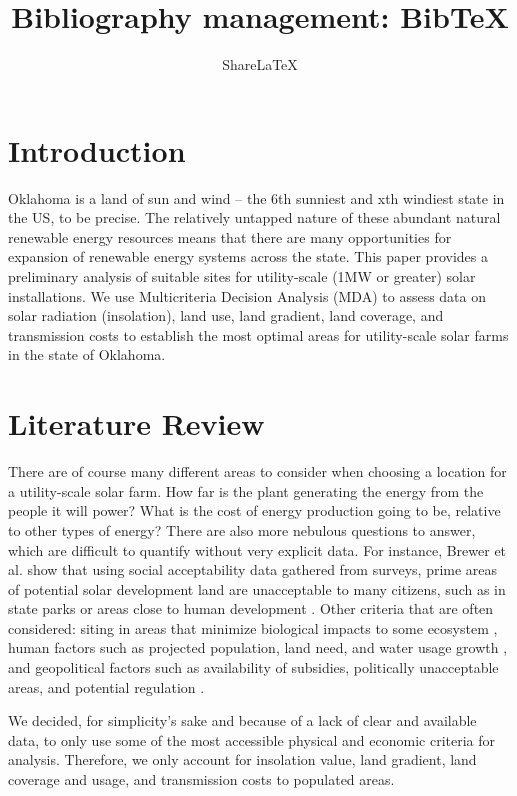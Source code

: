 \documentclass[a4paper,10pt]{article}
\title{Bibliography management: BibTeX}
\author{Share\LaTeX}
\begin{document}
\maketitle

\section{Introduction}

Oklahoma is a land of sun and wind – the 6th sunniest and xth windiest state in the US, to be precise. The relatively untapped nature of these abundant natural renewable energy resources means that there are many opportunities for expansion of renewable energy systems across the state. This paper provides a preliminary analysis of suitable sites for utility-scale (1MW or greater) solar installations. We use Multicriteria Decision Analysis (MDA) to assess data on solar radiation (insolation), land use, land gradient, land coverage, and transmission costs to establish the most optimal areas for utility-scale solar farms in the state of Oklahoma. 

\section{Literature Review}

There are of course many different areas to consider when choosing a location for a utility-scale solar farm. How far is the plant generating the energy from the people it will power? What is the cost of energy production going to be, relative to other types of energy? There are also more nebulous questions to answer, which are difficult to quantify without very explicit data. For instance, Brewer et al. show that using social acceptability data gathered from surveys, prime areas of potential solar development land are unacceptable to many citizens, such as in state parks or areas close to human development \cite{brewer}. Other criteria that are often considered: siting in areas that minimize biological impacts to some ecosystem \cite{stoms}, human factors such as projected population, land need, and water usage growth \cite{omitaomu}, and geopolitical factors such as availability of subsidies, politically unacceptable areas, and potential regulation \cite{tisza}. 

We decided, for simplicity's sake and because of a lack of clear and available data, to only use some of the most accessible physical and economic criteria for analysis. Therefore, we only account for insolation value, land gradient, land coverage and usage, and transmission costs to populated areas. 
\end{document}
